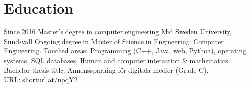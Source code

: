 \section{Education}



\begin{entrylist}
  \entry
    {Since 2016}
    {Master's degree in computer engineering}
    {Mid Sweden University, Sundsvall}
    {%
      Ongoing degree in Master of Science in Engineering: Computer\\Engineering. Touched areas: Programming (C++, Java, web, Python), operating systems, SQL databases, Human and computer interaction \& mathematics. \\
      Bachelor thesis title: Annonsspårning för digitala medier (Grade C). \\URL: \href{shorturl.at/npqY2}{shorturl.at/npqY2}
      }

\end{entrylist}